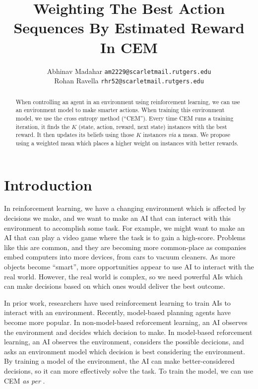 \documentclass{IEEEtran}
\title{Weighting The Best Action Sequences By Estimated Reward In CEM}
\author{%
  Abhinav Madahar \texttt{am2229@scarletmail.rutgers.edu} \\
  Rohan Ravella \texttt{rhr52@scarletmail.rutgers.edu}
}
\begin{document}
\maketitle

\begin{abstract}
    When controlling an agent in an environment using reinforcement learning, we can use an environment model to make smarter actions.
    When training this environment model, we use the cross entropy method (\enquote{CEM}).
    Every time CEM runs a training iteration, it finds the $K$ (state, action, reward, next state) instances with the best reward.
    It then updates its beliefs using those $K$ instances \textit{via} a mean.
    We propose using a weighted mean which places a higher weight on instances with better rewards.
\end{abstract}

\section{Introduction}
In reinforcement learning, we have a changing environment which is affected by decisions we make, and we want to make an AI that can interact with this environment to accomplish some task.
For example, we might want to make an AI that can play a video game where the task is to gain a high-score.
Problems like this are common, and they are becoming more common-place as companies embed computers into more devices, from cars to vacuum cleaners.
As more objects become \enquote{smart}, more opportunities appear to use AI to interact with the real world.
However, the real world is complex, so we need powerful AIs which can make decisions based on which ones would deliver the best outcome.

In prior work, researchers have used reinforcement learning to train AIs to interact with an environment.
Recently, model-based planning agents have become more popular.
In non-model-based reforcement learning, an AI observes the environment and decides which decision to make.
In model-based reforcement learning, an AI observes the environment, considers the possible decicions, and asks an environment model which decision is best considering the environment.
By training a model of the environment, the AI can make better-considered decisions, so it can more effectively solve the task.
To train the model, we can use CEM \textit{as per} \cite{hafner2018planet}.
\end{document}

